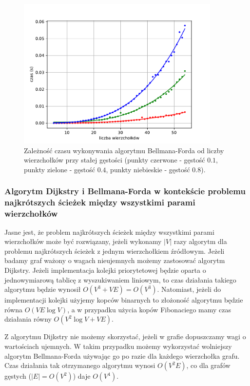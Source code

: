 \documentclass[12pt,a4paper]{book}
\theoremstyle{definition}
\numberwithin{equation}{chapter}
\begin{document}
\begin{figure}[H]
\centering
\includegraphics[width=0.9\textwidth]{images/Wykres_Bellman_Ford_gestosci.pdf}
\caption{Zależność czasu wykonywania algorytmu Bellmana-Forda od  liczby wierzchołków przy stałej gęstości (punkty czerwone - gęstość $0.1$, punkty zielone - gęstość $0.4$, punkty niebieskie - gęstość $0.8$).}
\label{rys_wykres_b_f_gestosci}
\end{figure}

\subsubsection*{Algorytm Dijkstry i Bellmana-Forda w kontekście problemu najkrótszych ścieżek między wszystkimi parami wierzchołków}
Jasne jest, że problem  najkrótszych ścieżek między wszystkimi parami wierzchołków może być rozwiązany, jeżeli wykonamy $|V|$ razy algorytm dla problemu najkrótszych ścieżek z jednym wierzchołkiem źródłowym. Jeżeli badamy graf ważony o wagach nieujemnych możemy zastosować algorytm  Dijkstry. Jeżeli implementacja kolejki priorytetowej będzie oparta o jednowymiarową tablicę z wyszukiwaniem liniowym, to czas działania takiego algorytmu będzie wynosił $O(V^3 + VE) = O(V^3)$. Natomiast, jeżeli do implementacji kolejki użyjemy kopców binarnych to złożoność algorytmu będzie równa $O(VE\log V)$, a w przypadku użycia kopów Fibonaciego mamy czas działania równy $O(V^2\log V+VE)$.

Z algorytmu Dijkstry nie możemy skorzystać, jeżeli w grafie dopuszczamy wagi o wartościach ujemnych. W takim przypadku możemy wykorzystać wolniejszy algorytm Bellmana-Forda używając go po razie dla każdego wierzchołka grafu. Czas działania tak otrzymanego algorytmu wynosi $O(V^2E)$, co dla grafów gęstych \big($|E|=O(V^2)$\big) daje $O(V^4)$.
\end{document}
